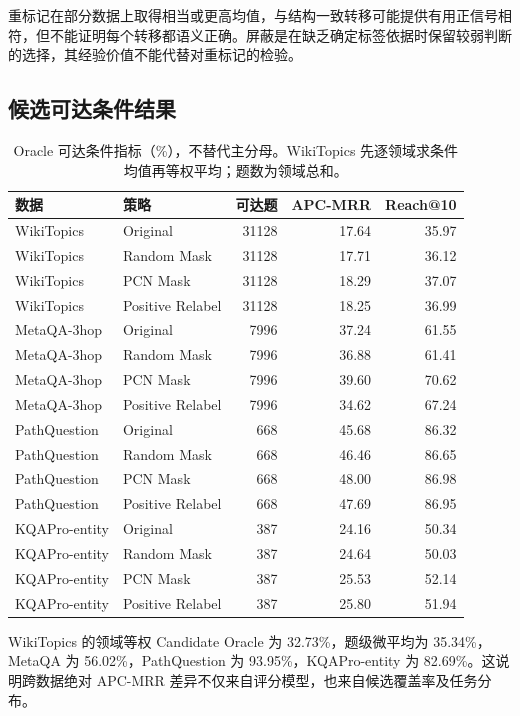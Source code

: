 \documentclass[UTF8,a4paper,10pt,fontset=fandol]{ctexart}
\begin{document}
重标记在部分数据上取得相当或更高均值，与结构一致转移可能提供有用正信号相符，但不能证明每个转移都语义正确。屏蔽是在缺乏确定标签依据时保留较弱判断的选择，其经验价值不能代替对重标记的检验。

\subsection{候选可达条件结果}
\begin{table}[tbp]\centering
\caption{Oracle 可达条件指标（\%），不替代主分母。WikiTopics 先逐领域求条件均值再等权平均；题数为领域总和。}\label{tab:conditional}
\small
\begin{tabular}{llrrr}
\toprule
数据 & 策略 & 可达题 & APC-MRR & Reach@10 \\
\midrule
WikiTopics & Original & 31128 & 17.64 & 35.97 \\
WikiTopics & Random Mask & 31128 & 17.71 & 36.12 \\
WikiTopics & PCN Mask & 31128 & 18.29 & 37.07 \\
WikiTopics & Positive Relabel & 31128 & 18.25 & 36.99 \\
MetaQA-3hop & Original & 7996 & 37.24 & 61.55 \\
MetaQA-3hop & Random Mask & 7996 & 36.88 & 61.41 \\
MetaQA-3hop & PCN Mask & 7996 & 39.60 & 70.62 \\
MetaQA-3hop & Positive Relabel & 7996 & 34.62 & 67.24 \\
PathQuestion & Original & 668 & 45.68 & 86.32 \\
PathQuestion & Random Mask & 668 & 46.46 & 86.65 \\
PathQuestion & PCN Mask & 668 & 48.00 & 86.98 \\
PathQuestion & Positive Relabel & 668 & 47.69 & 86.95 \\
KQAPro-entity & Original & 387 & 24.16 & 50.34 \\
KQAPro-entity & Random Mask & 387 & 24.64 & 50.03 \\
KQAPro-entity & PCN Mask & 387 & 25.53 & 52.14 \\
KQAPro-entity & Positive Relabel & 387 & 25.80 & 51.94 \\
\bottomrule
\end{tabular}
\end{table}

WikiTopics 的领域等权 Candidate Oracle 为 32.73\%，题级微平均为 35.34\%，MetaQA 为 56.02\%，PathQuestion 为 93.95\%，KQAPro-entity 为 82.69\%。这说明跨数据绝对 APC-MRR 差异不仅来自评分模型，也来自候选覆盖率及任务分布。
\end{document}
